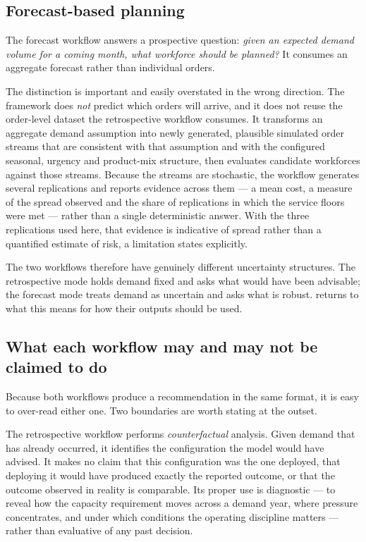 \subsection{Forecast-based planning}

The forecast workflow answers a prospective question: \emph{given an expected demand volume for
a coming month, what workforce should be planned?} It consumes an aggregate forecast rather
than individual orders.

The distinction is important and easily overstated in the wrong direction. The framework does
\emph{not} predict which orders will arrive, and it does not reuse the order-level dataset the
retrospective workflow consumes. It transforms an aggregate demand assumption into newly
generated, plausible simulated order streams that are consistent with that assumption and with
the configured seasonal, urgency and product-mix structure, then evaluates candidate workforces
against those streams. Because the streams are stochastic, the workflow generates several
replications and reports evidence across them --- a mean cost, a measure of the spread observed
and the share of replications in which the service floors were met --- rather than a single
deterministic answer. With the three replications used here, that evidence is indicative of
spread rather than a quantified estimate of risk, a limitation  states
explicitly.

The two workflows therefore have genuinely different uncertainty structures. The retrospective
mode holds demand fixed and asks what would have been advisable; the forecast mode treats
demand as uncertain and asks what is robust.  returns to what this means
for how their outputs should be used.

\subsection{What each workflow may and may not be claimed to do}

Because both workflows produce a recommendation in the same format, it is easy to over-read
either one. Two boundaries are worth stating at the outset.

The retrospective workflow performs \emph{counterfactual} analysis. Given demand that has
already occurred, it identifies the configuration the model would have advised. It makes no
claim that this configuration was the one deployed, that deploying it would have produced
exactly the reported outcome, or that the outcome observed in reality is comparable. Its proper
use is diagnostic --- to reveal how the capacity requirement moves across a demand year, where
pressure concentrates, and under which conditions the operating discipline matters --- rather
than evaluative of any past decision.

